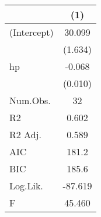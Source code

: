 \begin{table}
\centering
\begin{tabular}[t]{lS}
\toprule
  & {(1)}\\
\midrule
(Intercept) & 30.099\\
 & (1.634)\\
hp & -0.068\\
 & (0.010)\\
\midrule
Num.Obs. & 32\\
R2 & 0.602\\
R2 Adj. & 0.589\\
AIC & 181.2\\
BIC & 185.6\\
Log.Lik. & -87.619\\
F & 45.460\\
\bottomrule
\end{tabular}
\end{table}
